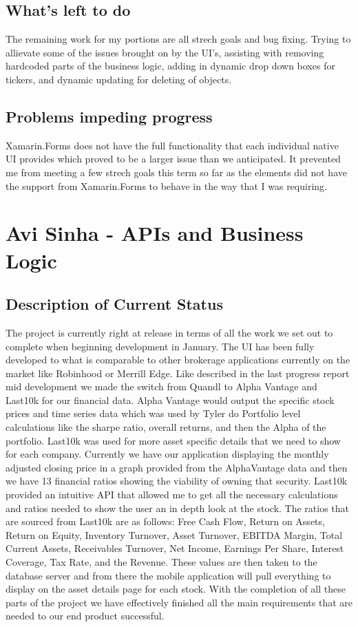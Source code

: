 \documentclass[letterpaper,10pt,titlepage,journal,compsoc,draftclsnofoot,onecolumn]{IEEEtran}
\begin{document}
\subsection{What's left to do}

The remaining work for my portions are all strech goals and bug fixing. Trying to allievate some of the issues brought on by the UI's, assisting with removing hardcoded parts of the business logic, adding in dynamic drop down boxes for tickers, and dynamic updating for deleting of objects.

\subsection{Problems impeding progress}

Xamarin.Forms does not have the full functionality that each individual native UI provides which proved to be a larger issue than we anticipated. It prevented me from meeting a few strech goals this term so far as the elements did not have the support from Xamarin.Forms to behave in the way that I was requiring.

\section{Avi Sinha - APIs and Business Logic}

\subsection{Description of Current Status}

The project is currently right at release in terms of all the work we set out to complete when beginning development in January. The UI has been fully developed to what is comparable to other brokerage applications currently on the market like Robinhood or Merrill Edge. Like described in the last progress report mid development we made the switch from Quandl to Alpha Vantage and Last10k for our financial data. Alpha Vantage would output the specific stock prices and time series data which was used by Tyler do Portfolio level calculations like the sharpe ratio, overall returns, and then the Alpha of the portfolio. Last10k was used for more asset specific details that we need to show for each company. Currently we have our application displaying the monthly adjusted closing price in a graph provided from the AlphaVantage data and then we have 13 financial ratios showing the viability of owning that security. Last10k provided an intuitive API that allowed me to get all the necessary calculations and ratios needed to show the user an in depth look at the stock. The ratios that are sourced from Last10k are as follows: Free Cash Flow, Return on Assets, Return on Equity, Inventory Turnover, Asset Turnover, EBITDA Margin, Total Current Assets, Receivables Turnover, Net Income, Earnings Per Share, Interest Coverage, Tax Rate, and the Revenue. These values are then taken to the database server and from there the mobile application will pull everything to display on the asset details page for each stock. With the completion of all these parts of the project we have effectively finished all the main requirements that are needed to our end product successful. 
\end{document}
